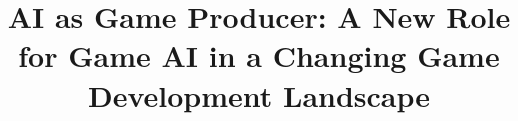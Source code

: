 \documentclass[conference]{IEEEtran}
\begin{document}
%
\title{AI as Game Producer: A New Role for Game AI in a Changing Game Development Landscape}

\author{
}


% 








\maketitle
\end{document}
